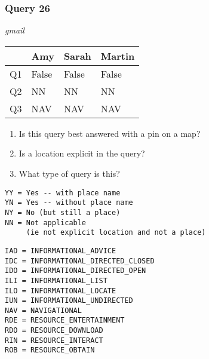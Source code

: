 \begin{frame}[fragile]
\frametitle{Query 26}
\vspace{1em}

\emph{gmail}

\vfill

\begin{table}
  \centering
  \begin{tabular}{ l l l l }
    & \textbf{Amy} & \textbf{Sarah} & \textbf{Martin}\\
    \toprule
    Q1 & False & False & False\\
Q2 & NN & NN & NN\\
Q3 & NAV & NAV & NAV\\
    \bottomrule
  \end{tabular}
\end{table}

\vfill

\tiny{

\begin{enumerate}
\item Is this query best answered with a pin on a map?
\item Is a location explicit in the query?
\item What type of query is this?
\end{enumerate}

\vfill

\begin{multicols}{2}
\begin{verbatim}
YY = Yes -- with place name
YN = Yes -- without place name
NY = No (but still a place)
NN = Not applicable 
     (ie not explicit location and not a place)
\end{verbatim}

\columnbreak
\begin{verbatim}
IAD = INFORMATIONAL_ADVICE
IDC = INFORMATIONAL_DIRECTED_CLOSED
IDO = INFORMATIONAL_DIRECTED_OPEN
ILI = INFORMATIONAL_LIST
ILO = INFORMATIONAL_LOCATE
IUN = INFORMATIONAL_UNDIRECTED
NAV = NAVIGATIONAL
RDE = RESOURCE_ENTERTAINMENT
RDO = RESOURCE_DOWNLOAD
RIN = RESOURCE_INTERACT
ROB = RESOURCE_OBTAIN
\end{verbatim}
\end{multicols}
}

\end{frame}


